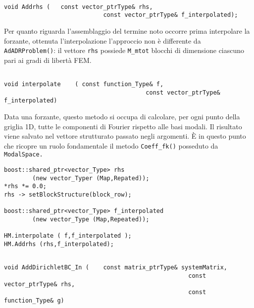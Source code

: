 \begin{lstlisting}[style=general, frame = top]

void Addrhs	(	const vector_ptrType& rhs,
							const vector_ptrType& f_interpolated);
\end{lstlisting}
Per quanto riguarda l'assemblaggio del termine noto occorre prima interpolare la forzante, ottenuta l'interpolazione l'approccio non \`e differente da \texttt{AdADRProblem()}: il vettore \texttt{rhs} possiede \texttt{M\_mtot} blocchi di dimensione ciascuno pari ai gradi di libert\`a FEM.

\begin{lstlisting}[style = general, frame = top]

void interpolate	( const function_Type& f,
										const vector_ptrType& f_interpolated)
\end{lstlisting}

Data una forzante, questo metodo si occupa di calcolare, per ogni punto della griglia 1D, tutte le componenti di Fourier rispetto alle basi modali. Il risultato viene salvato nel vettore strutturato passato negli argomenti. \`E in questo punto che ricopre un ruolo fondamentale il metodo \texttt{Coeff\_fk()} posseduto da \texttt{ModalSpace.}

\begin{lstlisting}[style = general]
boost::shared_ptr<vector_Type> rhs 
		(new vector_Typer (Map,Repated));
*rhs *= 0.0;
rhs -> setBlockStructure(block_row);

boost::shared_ptr<vector_Type> f_interpolated 
		(new vector_Type (Map,Repeated));

HM.interpolate ( f,f_interpolated );
HM.Addrhs (rhs,f_interpolated);
\end{lstlisting}


\begin{lstlisting}[style = general,frame = top]

void AddDirichletBC_In (	const matrix_ptrType& systemMatrix,
													const vector_ptrType& rhs,
													const function_Type& g)
\end{lstlisting}

